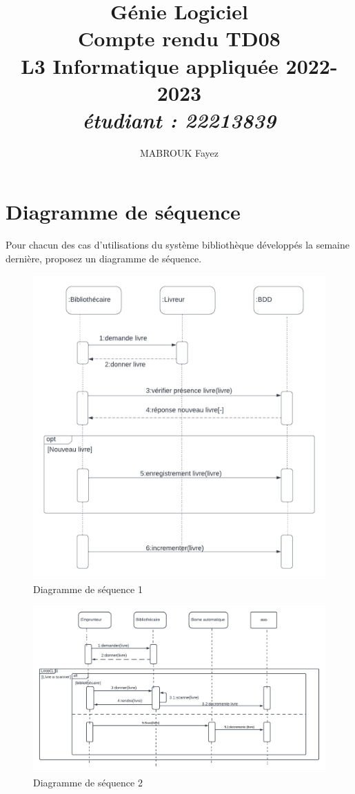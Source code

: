 \documentclass[12pt]{article}
\author{MABROUK Fayez}
\title{{\bf  Génie Logiciel} \\
	Compte rendu TD08  \\
	{\small L3 Informatique appliquée 2022-2023} \\
	{\it \small \no étudiant : 22213839 }}
\begin{document}
	\maketitle
	\newpage
	\section{Diagramme de séquence}
	Pour chacun des cas d’utilisations du système bibliothèque développés la semaine dernière,
	proposez un diagramme de séquence.
	\begin{figure}[!hbtp]
		\centering
		\includegraphics[scale=0.75]{capture1_S.png}
		\caption{Diagramme de séquence 1}
	\end{figure}
\newpage
\begin{figure}[!hbtp]
	\centering
	\includegraphics[scale=0.65]{capture2_S.png}
	\caption{Diagramme de séquence 2}
\end{figure}
	
\end{document}
